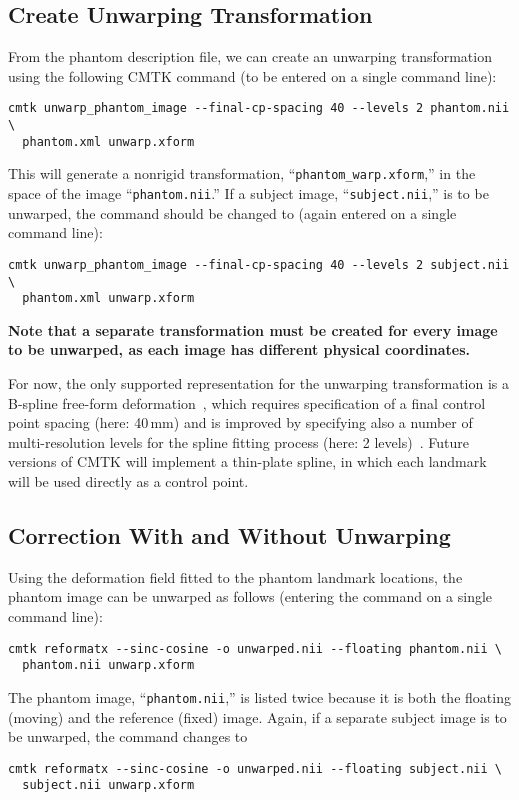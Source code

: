 \documentclass{InsightArticle}
\begin{document}
\subsection{Create Unwarping Transformation}

From the phantom description file, we can create an unwarping transformation
using the following CMTK command (to be entered on a single command line):
\begin{verbatim}
cmtk unwarp_phantom_image --final-cp-spacing 40 --levels 2 phantom.nii \
  phantom.xml unwarp.xform
\end{verbatim}
This will generate a nonrigid transformation, ``\texttt{phantom\_warp.xform},''
in the space of the image ``\texttt{phantom.nii}.'' If a subject image, ``\texttt{subject.nii},'' is to
be unwarped, the command should be changed to (again entered on a single
command line):
\begin{verbatim}
cmtk unwarp_phantom_image --final-cp-spacing 40 --levels 2 subject.nii \
  phantom.xml unwarp.xform
\end{verbatim}

{\bf Note that a separate transformation must be created for every
  image to be unwarped, as each image has different physical coordinates.}

For now, the only supported representation for the unwarping transformation is
a B-spline free-form deformation~\cite{RuecSonoHaye:1999}, which requires
specification of a final control point spacing (here: 40\,mm) and is improved
by specifying also a number of multi-resolution levels for the spline fitting
process (here: 2 levels)~\cite{LeeWolbShin:1997}. Future versions of CMTK will
implement a thin-plate spline, in which each landmark will be used directly as
a control point.

\subsection{Correction With and Without Unwarping}

Using the deformation field fitted to the phantom landmark locations, the
phantom image can be unwarped as follows (entering the command on a single
command line):
\begin{verbatim}
cmtk reformatx --sinc-cosine -o unwarped.nii --floating phantom.nii \
  phantom.nii unwarp.xform
\end{verbatim} 
The phantom image, ``\texttt{phantom.nii},'' is listed twice
because it is both the floating (moving) and the reference (fixed)
image. Again, if a separate subject image is to be unwarped, the command
changes to
\begin{verbatim}
cmtk reformatx --sinc-cosine -o unwarped.nii --floating subject.nii \
  subject.nii unwarp.xform
\end{verbatim}
\end{document}
